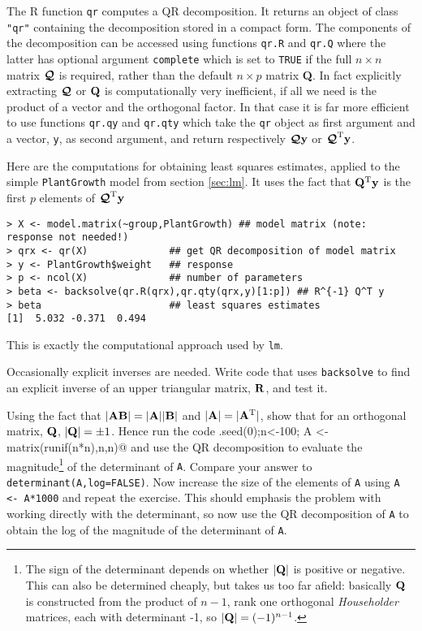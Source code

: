 \documentclass[10pt] {article}
\newcommand{\ts}{^{\rm T}}
\theoremstyle{definition}
\begin{document}
The R function {\tt qr} computes a QR decomposition. It returns an object of class \verb+"qr"+ containing the decomposition stored in a compact form. The components of the decomposition can be accessed using functions \lstinline+qr.R+ and \lstinline+qr.Q+ where the latter has optional argument \lstinline+complete+ which is set to {\tt TRUE} if the full $n \times n$ matrix $\bm{{\cal Q}}$ is required, rather than the default $n \times p$ matrix {\bf Q}. In fact explicitly extracting $\bm{{\cal Q}}$ or ${\bf Q}$ is computationally very inefficient, if all we need is the product of a vector and the orthogonal factor. In that case it is far more efficient to use functions \lstinline+qr.qy+ and \lstinline+qr.qty+ which take the {\tt qr} object as first argument and a vector, {\tt y}, as second argument, and return respectively $\bm{{\cal Q}}{\bf y}$ or  $\bm{{\cal Q}}\ts {\bf y}$. 

Here are the computations for obtaining least squares estimates, applied to the simple {\tt PlantGrowth} model from section \ref{sec:lm}. It uses the fact that ${\bf Q}\ts {\bf y}$ is the first $p$ elements of $\bm{{\cal Q}}\ts {\bf y}$
\begin{lstlisting}
> X <- model.matrix(~group,PlantGrowth) ## model matrix (note: response not needed!)
> qrx <- qr(X)              ## get QR decomposition of model matrix
> y <- PlantGrowth$weight   ## response
> p <- ncol(X)              ## number of parameters  
> beta <- backsolve(qr.R(qrx),qr.qty(qrx,y)[1:p]) ## R^{-1} Q^T y
> beta                      ## least squares estimates
[1]  5.032 -0.371  0.494
\end{lstlisting}  
This is exactly the computational approach used by {\tt lm}. 

 Occasionally explicit inverses are needed. Write code that uses {\tt backsolve} to find an explicit inverse of an upper triangular matrix, $\bf R$, and test it.   

 Using the fact that $|{\bf AB}|=|{\bf A}||{\bf B}|$ and $|{\bf A}| = |{\bf A}\ts|$, show that for an orthogonal matrix, $\bf Q$, $|{\bf Q}|=\pm 1$. Hence run the code \lstinline@set.seed(0);n<-100; A <- matrix(runif(n*n),n,n)@ and use the QR decomposition to evaluate the magnitude\footnote{The sign of the determinant depends on whether $|{\bf Q}|$ is positive or negative. This can also be determined cheaply, but takes us too far afield: basically $\bf Q$ is constructed from the product of $n-1$, rank one orthogonal {\em Householder} matrices, each with determinant -1, so $|{\bf Q}| = (-1)^{n-1}$.} of the determinant of {\tt A}. Compare your answer to \lstinline+determinant(A,log=FALSE)+. Now increase the size of the elements of {\tt A} using \lstinline+A <- A*1000+ and repeat the exercise. This should emphasis the problem with working directly with the determinant, so now use the QR decomposition of {\tt A} to obtain the log of the magnitude of the determinant of {\tt A}. 
\end{document}
